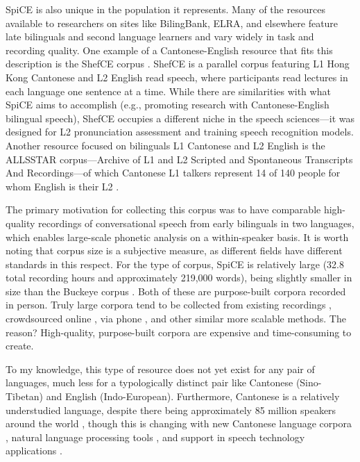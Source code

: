 SpiCE is also unique in the population it represents. Many of the resources available to researchers on sites like BilingBank, ELRA, and elsewhere feature late bilinguals and second language learners and vary widely in task and recording quality. One example of a Cantonese-English resource that fits this description is the ShefCE corpus \citep{ng_shefce_2017}. ShefCE is a parallel corpus featuring L1 Hong Kong Cantonese and L2 English read speech, where participants read lectures in each language one sentence at a time. While there are similarities with what SpiCE aims to accomplish (e.g., promoting research with Cantonese-English bilingual speech), ShefCE occupies a different niche in the speech sciences---it was designed for L2 pronunciation assessment and training speech recognition models. Another resource focused on bilinguals L1 Cantonese and L2 English is the ALLSSTAR corpus---Archive of L1 and L2 Scripted and Spontaneous Transcripts And Recordings---of which Cantonese L1 talkers represent 14 of 140 people for whom English is their L2 \citep{bradlow_2011_allsstar}. 

The primary motivation for collecting this corpus was to have comparable high-quality recordings of conversational speech from early bilinguals in two languages, which enables large-scale phonetic analysis on a within-speaker basis. It is worth noting that corpus size is a subjective measure, as different fields have different standards in this respect. For the type of corpus, SpiCE is relatively large (32.8 total recording hours and approximately 219,000 words), being slightly smaller in size than the Buckeye corpus \citep[approximately 40 total recording hours and 307,000 words][]{pitt_2005_buckeye}. Both of these are purpose-built corpora recorded in person. Truly large corpora tend to be collected from existing recordings \citep[radio, YouTube, audiobooks, etc.; e.g., Librispeech, 1000 hours:][]{panayotov_librispeech_2015}, crowdsourced online \citep[e.g. Mozilla Common Voice, 2500 hours:][]{ardila_2020_common}, via phone \citep[e.g., SWITCHBOARD, 260 hours:][]{godfrey_switchboard_1992}, and other similar more scalable methods. The reason? High-quality, purpose-built corpora are expensive and time-consuming to create.

To my knowledge, this type of resource does not yet exist for any pair of languages, much less for a typologically distinct pair like Cantonese (Sino-Tibetan) and English (Indo-European). Furthermore, Cantonese is a relatively understudied language, despite there being approximately 85 million speakers around the world \citep{ethnologue_yue_2021}, though this is changing with new Cantonese language corpora \citep{luke_2015_hkc, leung_2001_hkcac, winterstein_2020_cantomap, alderete_2019_tone}, natural language processing tools \citep{lee_2018_pycantonese,yau_2019_pyjyutping}, and support in speech technology applications \citep{google_2019_stt}.

